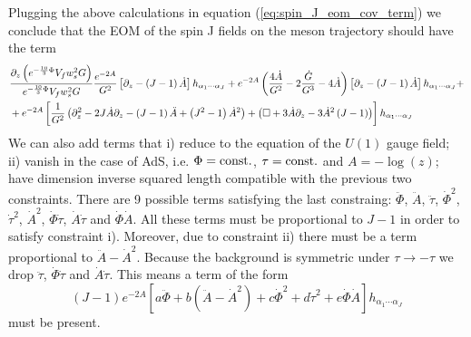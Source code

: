 \documentclass[10 pt]{article}
\begin{document}
Plugging the above calculations in equation (\ref{eq:spin_J_eom_cov_term}) we conclude that the EOM of the spin J fields on the meson trajectory should have the term
\begin{align}
&\frac{\partial_z \left(e^{-\frac{10}{3}\Phi} V_f w_s^2 G\right)}{e^{-\frac{10}{3}\Phi} V_f w_s^2 G} \frac{e^{-2A}}{G^2} \left[\partial_z - \left(J-1\right) \dot{A} \right]h_{\alpha_1 \cdots \alpha_J} + e^{-2A}\left( \frac{4 \dot{A}}{G^2} - 2 \frac{\dot{G}}{G^3} - 4 \dot{A} \right) \left[\partial_z - \left(J-1\right) \dot{A} \right]h_{\alpha_1  \cdots \alpha_J} + \notag \\
&+e^{-2A} \left[\frac{1}{G^2}\left(\partial_z^2 - 2 J \dot{A} \partial_z - \left(J-1\right) \ddot{A} + \left(J^2-1\right) {\dot{A}}^2 \right)+ \left( \Box + 3\dot{A} \partial_z - 3 {\dot{A}}^2 \left(J-1\right) \right)  \right]h_{\alpha_1 \cdots \alpha_J}
\end{align}
We can also add terms that i) reduce to the equation of the $U\left(1\right)$ gauge field; ii) vanish in the case of AdS, i.e. $\Phi = \rm{const.}$, $\tau = \rm{const.}$ and $A =  - \log(z)$; have dimension inverse squared length compatible with the previous two constraints. There are 9 possible terms satisfying the last constraing: $\ddot{\Phi}$, $\ddot{A}$, $\ddot{\tau}$, ${\dot{\Phi}}^2$, ${\dot{\tau}}^2$, ${\dot{A}}^2$, $\dot{\Phi} \dot{\tau}$, $\dot{A}\dot{\tau}$ and $\dot{\Phi}\dot{A}$. All these terms must be proportional to $J-1$ in order to satisfy constraint i). Moreover, due to constraint ii) there must be a term proportional to $\ddot{A} - \dot{A}^2$. Because the background is symmetric under $\tau \rightarrow -\tau$ we drop $\ddot{\tau}$, $\dot{\Phi}\dot{\tau}$ and $\dot{A}\dot{\tau}$. This means a term of the form
\begin{equation}
\left(J-1\right) e^{-2A} \left[ a \ddot{\Phi} + b \left(\ddot{A} - {\dot{A}}^2\right) + c {\dot{\Phi}}^2 + d {\dot{\tau}}^2 + e \dot{\Phi} \dot{A} \right] h_{\alpha_1 \cdots \alpha_J}
\end{equation}
must be present.
\end{document}
